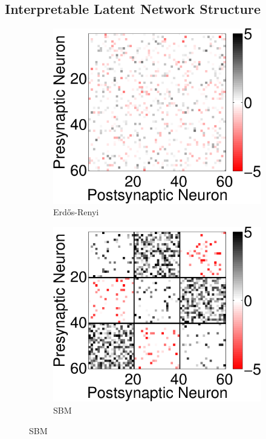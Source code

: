 \documentclass[aos]{imsart} %
\begin{document}
\subsection{Interpretable Latent Network Structure}
\begin{figure}[t]
  \centering
  \begin{subfigure}[b]{.3\textwidth}
    \centering
    \includegraphics[width=.9\textwidth]{figures/sparse}
    \caption{Erd\H{o}s-Renyi}
    \label{fig:er}
  \end{subfigure}
  \begin{subfigure}[b]{.3\textwidth}
    \centering
    \includegraphics[width=.9\textwidth]{figures/sbm}
    \caption{SBM}

\end{subfigure}
\end{figure}
\end{document}
